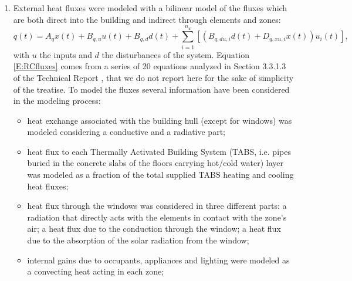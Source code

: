 {\begin{enumerate}
		The heat exchange between two adjacent layers, i.e. layer "a" and layer "b", was modeled to be proportional to the temperature difference of the two layers and the corresponding thermal resistance $R$, as follows
		\begin{equation}\label{E:RCHeatExchange}
			\begin{aligned}
				&C_a\dot x_a = \left(x_b(t) - x_a(t)\right)/R\\
				&C_b\dot x_b = \left(x_a(t) - x_b(t)\right)/R,
			\end{aligned}
		\end{equation}
		where $C_a$ and $C_b$ are the heat capacitances of the layers. This is done for each layer of each zone, obtaining the compact model \eqref{E:RCZoneEq}. The thermal parameters were derived from zones geometry and materials data.
	\item External heat fluxes were modeled with a bilinear model of the fluxes which are both direct into the building and indirect through elements and zones:
		\begin{equation}\label{E:RCfluxes}
			q(t) = A_q x(t) + B_{q,u}u(t) + B_{q,d}d(t) + \sum_{i=1}^{n_u}{[\left(B_{q,du,i}d(t) + D_{q,xu,i}x(t)\right)u_i(t)]},
		\end{equation}
		with $u$ the inputs and $d$ the disturbances of the system.
		Equation \eqref{E:RCfluxes} comes from a series of 20 equations analyzed in Section 3.3.1.3 of the Technical Report \cite{SturzeneggerTR}, that we do not report here for the sake of simplicity of the treatise. To model the fluxes several information have been considered in the modeling process:
	\begin{itemize}
		\item heat exchange associated with the building hull (except for windows) was modeled considering a conductive and a radiative part;
		\item  heat flux to each Thermally Activated Building System (TABS, i.e. pipes buried in the concrete slabs of the floors carrying hot/cold water) layer was modeled as a fraction of the total supplied TABS heating and cooling heat fluxes;
		\item heat flux through the windows was considered in three different parts: a radiation that directly acts with the elements in contact with the zone's air; a heat flux due to the conduction through the window; a heat flux due to the absorption of the solar radiation from the window;
		\item internal gains due to occupants, appliances and lighting were modeled as a convecting heat acting in each zone;

\end{itemize}
\end{enumerate}}
